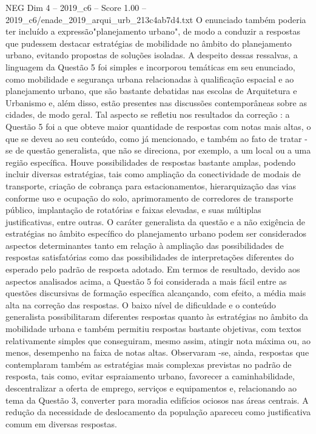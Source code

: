 \begin{textsample}{NEG Dim 4 – 2019\_c6 – Score 1.00 – 2019\_c6/enade\_2019\_arqui\_urb\_213c4ab7d4.txt}
O enunciado também poderia ter incluído a expressão"planejamento urbano", de modo a conduzir a respostas que pudessem destacar estratégias de mobilidade no âmbito do planejamento urbano, evitando propostas de soluções isoladas.
A despeito dessas ressalvas, a linguagem da Questão 5 foi simples e incorporou temáticas em seu enunciado, como mobilidade e segurança urbana relacionadas à qualificação espacial e ao planejamento urbano, que são bastante debatidas nas escolas de Arquitetura e Urbanismo e, além disso, estão presentes nas discussões contemporâneas sobre as cidades, de modo geral.
Tal aspecto se refletiu nos resultados da correção : a Questão 5 foi a que obteve maior quantidade de respostas com notas mais altas, o que se deveu ao seu conteúdo, como já mencionado, e também ao fato de tratar -se de questão generalista, que não se direciona, por exemplo, a um local ou a uma região específica.
Houve possibilidades de respostas bastante amplas, podendo incluir diversas estratégias, tais como ampliação da conectividade de modais de transporte, criação de cobrança para estacionamentos, hierarquização das vias conforme uso e ocupação do solo, aprimoramento de corredores de transporte público, implantação de rotatórias e faixas elevadas, e suas múltiplas justificativas, entre outras.
O caráter generalista da questão e a não exigência de estratégias no âmbito específico do planejamento urbano podem ser considerados aspectos determinantes tanto em relação à ampliação das possibilidades de respostas satisfatórias como das possibilidades de interpretações diferentes do esperado pelo padrão de resposta adotado.
Em termos de resultado, devido aos aspectos analisados acima, a Questão 5 foi considerada a mais fácil entre as questões discursivas de formação específica alcançando, com efeito, a média mais alta na correção das respostas.
O baixo nível de dificuldade e o conteúdo generalista possibilitaram diferentes respostas quanto às estratégias no âmbito da mobilidade urbana e também permitiu respostas bastante objetivas, com textos relativamente simples que conseguiram, mesmo assim, atingir nota máxima ou, ao menos, desempenho na faixa de notas altas.
Observaram -se, ainda, respostas que contemplaram também as estratégias mais complexas previstas no padrão de resposta, tais como, evitar espraiamento urbano, favorecer a caminhabilidade, descentralizar a oferta de emprego, serviços e equipamentos e, relacionando ao tema da Questão 3, converter para moradia edifícios ociosos nas áreas centrais.
A redução da necessidade de deslocamento da população apareceu como justificativa comum em diversas respostas.

\end{textsample}
